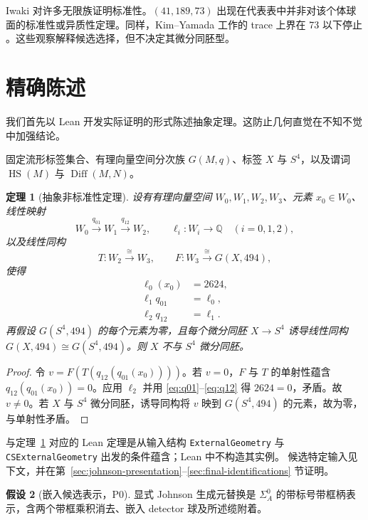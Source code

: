 \documentclass[11pt]{amsart}
\newtheorem{theorem}{定理}[section]
\theoremstyle{definition}
\newtheorem{hypothesis}[theorem]{假设}
\theoremstyle{remark}
\newcommand{\Q}{\mathbb{Q}}
\begin{document}
Iwaki 对许多无限族证明标准性。$(41,189,73)$ 出现在代表表中并非对该个体球面的标准性或异质性定理。同样，Kim--Yamada 工作的 trace 上界在 73 以下停止 \cite{KimYamada2017}。这些观察解释候选选择，但不决定其微分同胚型。
\section{精确陈述}

我们首先以 Lean 开发实际证明的形式陈述抽象定理。这防止几何直觉在不知不觉中加强结论。

固定流形标签集合、有理向量空间分次族 $G(M,q)$、标签 $X$ 与 $S^4$，以及谓词
\(\operatorname{HS}(M)\) 与 \(\operatorname{Diff}(M,N)\)。

\begin{theorem}[抽象非标准性定理]\label{thm:A}
设有有理向量空间 $W_0,W_1,W_2,W_3$、元素 $x_0\in W_0$、线性映射
\[
W_0\xrightarrow{q_{01}}W_1\xrightarrow{q_{12}}W_2,
\qquad
\ell_i:W_i\longrightarrow\Q\quad (i=0,1,2),
\]
以及线性同构
\[
T:W_2\xrightarrow{\cong}W_3,
\qquad
F:W_3\xrightarrow{\cong}G(X,494),
\]
使得
\begin{align}
\ell_0(x_0)&=2624,\label{eq:value}\\
\ell_1q_{01}&=\ell_0,\label{eq:q01}\\
\ell_2q_{12}&=\ell_1.\label{eq:q12}
\end{align}
再假设 $G(S^4,494)$ 的每个元素为零，且每个微分同胚 $X\to S^4$ 诱导线性同构
\(G(X,494)\cong G(S^4,494)\)。则 $X$ 不与 $S^4$ 微分同胚。
\end{theorem}

\begin{proof}
令 $v=F(T(q_{12}(q_{01}(x_0))))$。若 $v=0$，$F$ 与 $T$ 的单射性蕴含 $q_{12}(q_{01}(x_0))=0$。应用 $\ell_2$ 并用 \eqref{eq:q01}--\eqref{eq:q12} 得 $2624=0$，矛盾。故 $v\ne0$。若 $X$ 与 $S^4$ 微分同胚，诱导同构将 $v$ 映到 $G(S^4,494)$ 的元素，故为零，与单射性矛盾。
\end{proof}

与定理~\ref{thm:A} 对应的 Lean 定理是从输入结构 \texttt{ExternalGeometry} 与
\texttt{CSExternalGeometry} 出发的条件蕴含；Lean 中不构造其实例。
候选特定输入见下文，并在第~\ref{sec:johnson-presentation}--\ref{sec:final-identifications} 节证明。

\begin{hypothesis}[嵌入候选表示，P0]\label{hyp:P0}
显式 Johnson 生成元替换是 $\Sigma_A^0$ 的带标号带框柄表示，含两个带框乘积消去、嵌入 detector 球及所述缆附着。
\end{hypothesis}
\end{document}

